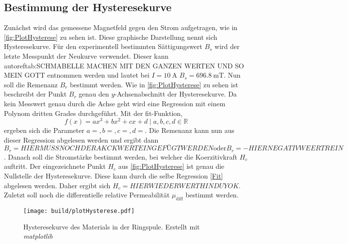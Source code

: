 \subsection{Bestimmung der Hysteresekurve}
\label{A_Hysterese}
Zunächst wird das gemessene Magnetfeld gegen den Strom aufgetragen, wie in \autoref{fig:PlotHysterese} zu sehen ist. Diese graphische Darstellung nennt sich Hysteresekurve. Für den experimentell bestimmten
Sättigungswert $B_s$ wird der letzte Messpunkt der Neukurve verwendet. Dieser kann autoref{tab:SCHMABELLE MACHEN MIT DEN GANZEN WERTEN UND SO MEIN GOTT} entnommen werden und lautet bei $I = 10\:\unit{\ampere}$ $B_s = 696.8\:\unit{\milli\tesla}$.
Nun soll die Remenanz $B_r$ bestimmt werden. Wie in \autoref{fig:PlotHysterese} zu sehen ist beschreibt der Punkt $B_r$ genau den $y$-Achsenabschnitt der Hysteresekurve. Da kein Messwert genau 
durch die Achse geht wird eine Regression mit einem Polynom dritten Grades durchgeführt. Mit der fit-Funktion,
\begin{equation}
    \label{Fit}
    f(x) = ax^3+bx^2+cx+d \mid a,b,c,d \in \mathbb{R}
\end{equation}
ergeben sich die Parameter $a = ,b = ,c = ,d = $\cite{scipy}.
Die Remenanz kann nun aus dieser Regression abgelesen werden und ergibt dann $B_r = HIER MUSS NOCH DER AKCK WERT EINGEFÜGT WERDEN \text{oder} B_r = -HIER NEGATIVWEERT REIN$.
Danach soll die Stromstärke bestimmt werden, bei welcher die Koerzitivkraft $H_c$ auftritt. 
Der eingezeichnete Punkt $H_c$ aus \autoref{fig:PlotHysterese} ist genau die Nullstelle der Hysteresekurve. Diese kann durch die selbe Regression \ref{Fit} abgelesen werden.
Daher ergibt sich $H_c = HIER WIEDER WERT HIN DU YOK$.  
Zuletzt soll noch die differentielle relative Permeabilität $\mu_{\text{diff}}$ bestimmt werden.


\begin{figure}
    \centering
    \caption{Hysteresekurve des Materials in der Ringspule. Erstellt mit \textit{matplotlib} \cite{matplotlib}}
    \label{fig:PlotHysterese}
    \texttt{[image: build/plotHysterese.pdf]}
\end{figure}
